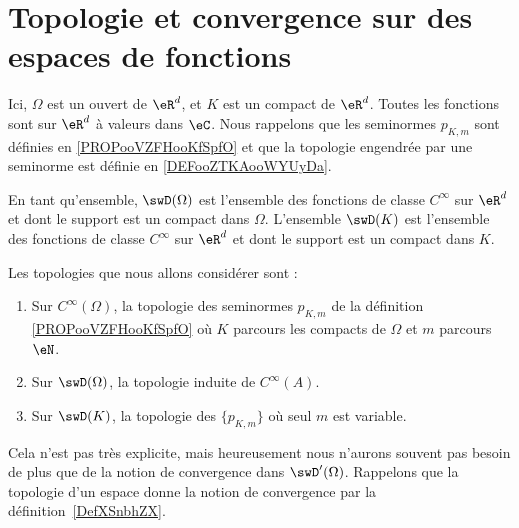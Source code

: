 \section{Topologie et convergence sur des espaces de fonctions}


\begin{normaltext}
    Ici, \( \Omega\) est un ouvert de \( \eR^d\), et \( K\) est un compact de \( \eR^d\). Toutes les fonctions sont sur \( \eR^d\) à valeurs dans \( \eC\). Nous rappelons que les seminormes \( p_{K,m}\) sont définies en \ref{PROPooVZFHooKfSpfO} et que la topologie engendrée par une seminorme est définie en \ref{DEFooZTKAooWYUyDa}.

    En tant qu'ensemble, \( \swD(\Omega)\) est l'ensemble des fonctions de classe \(  C^{\infty}\) sur \( \eR^d\) et dont le support est un compact dans \( \Omega\). L'ensemble \( \swD(K)\) est l'ensemble des fonctions de classe \(  C^{\infty}\) sur \( \eR^d\) et dont le support est un compact dans \( K\).
\end{normaltext}

\begin{definition}  \label{DefFGGCooTYgmYf}
    Les topologies que nous allons considérer sont :
\begin{enumerate}
    \item
        Sur \(  C^{\infty}(\Omega)\), la topologie des seminormes \( p_{K,m}\) de la définition \ref{PROPooVZFHooKfSpfO} où \( K\) parcours les compacts de \( \Omega\) et \( m\) parcours \( \eN\).

    \item       \label{ITEMooIZWSooOoIVWx}
        Sur \( \swD(\Omega)\), la topologie induite de \(  C^{\infty}(A)\).
    \item
        Sur \( \swD(K)\), la topologie des \( \{ p_{K,m} \}\) où seul \( m\) est variable.
\end{enumerate}
\end{definition}

Cela n'est pas très explicite, mais heureusement nous n'aurons souvent pas besoin de plus que de la notion de convergence dans \( \swD'(\Omega)\). Rappelons que la topologie d'un espace donne la notion de convergence par la définition~\ref{DefXSnbhZX}.

